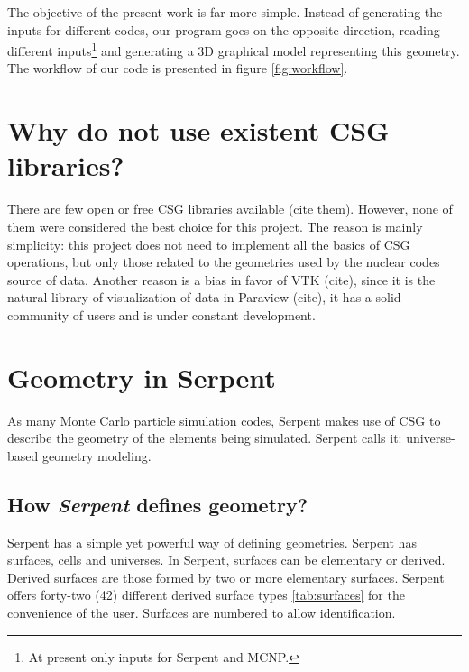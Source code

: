 \documentclass{elsarticle}
\begin{document}
The objective of the present work is far more simple. Instead of generating the inputs for
different codes, our program goes on the opposite direction, reading different
inputs\footnote{At present only inputs for Serpent and MCNP.} and generating
a 3D graphical model representing this geometry. The workflow of our code is presented
in figure \ref{fig:workflow}.

\section{Why do not use existent CSG libraries?}

There are few open or free CSG libraries available (cite them). However, none of them were considered
the best choice for this project. The reason is mainly simplicity: this project does not need to implement
all the basics of CSG operations, but only those related to the geometries used by the nuclear codes
source of data. Another reason is a bias in favor of VTK (cite), since it is the natural library of visualization
of data in Paraview (cite), it has a solid community of users and is under constant development.

\section{Geometry in Serpent}

As many Monte Carlo particle simulation codes, Serpent makes use of CSG to
describe the geometry of the elements being simulated. Serpent calls it: universe-based geometry modeling.



\subsection{How \textit{Serpent} defines geometry?}

Serpent has a simple yet powerful way of defining geometries. Serpent has 
surfaces, cells and universes. In Serpent, surfaces can be elementary or 
derived. Derived surfaces are those formed by two or more elementary surfaces. 
Serpent offers forty-two (42) different derived surface types \ref{tab:surfaces} for the convenience of the user. Surfaces are numbered to allow identification.
\end{document}
